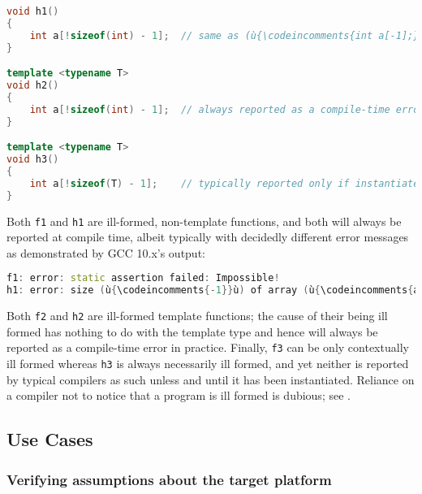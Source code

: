 \begin{lstlisting}[language=C++]
void h1()
{
    int a[!sizeof(int) - 1];  // same as (ù{\codeincomments{int a[-1];}}ù) and is ill formed
}

template <typename T>
void h2()
{
    int a[!sizeof(int) - 1];  // always reported as a compile-time error
}

template <typename T>
void h3()
{
    int a[!sizeof(T) - 1];    // typically reported only if instantiated
}
\end{lstlisting}

\noindent Both \lstinline!f1! and \lstinline!h1! are ill-formed, non-template functions,
and both will always be reported at compile time, albeit typically with
decidedly different error messages as demonstrated by GCC 10.x's output:

\begin{lstlisting}[language=C++]
f1: error: static assertion failed: Impossible!
h1: error: size (ù{\codeincomments{-1}}ù) of array (ù{\codeincomments{a}}ù) is negative
\end{lstlisting}

\noindent Both \lstinline!f2! and \lstinline!h2! are ill-formed template functions; the cause of their being ill formed has nothing to do with the
template type and hence will always be reported as a compile-time error
in practice. Finally, \lstinline!f3! can be only contextually ill formed
whereas \lstinline!h3! is always necessarily ill formed, and yet neither is
reported by typical compilers as such unless and until it has been
instantiated. Reliance on a compiler not to notice that a program is
ill formed is dubious; see
.

\subsection[Use Cases]{Use Cases}\label{use-cases}

\subsubsection[Verifying assumptions about the target platform]{Verifying assumptions about the target platform}\label{verifying-assumptions-about-the-target-platform}

